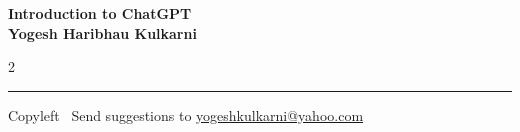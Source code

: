 \documentclass[8pt,landscape]{article}
\begin{document}
\footnotesize


\begin{center}
\Large{\textbf{Introduction to ChatGPT\\ Yogesh Haribhau Kulkarni}}  
\end{center}

\begin{multicols}{2}

\end{multicols}

\rule{\linewidth}{0.25pt}
\scriptsize
Copyleft \textcopyleft\  Send suggestions to 
\href{http://www.yogeshkulkarni.com}{yogeshkulkarni@yahoo.com}
\end{document}
